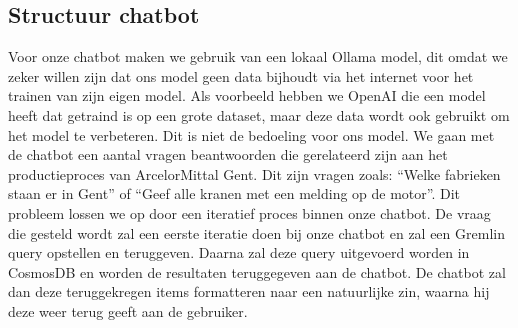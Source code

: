 \subsection{Structuur chatbot}
Voor onze chatbot maken we gebruik van een lokaal Ollama model, dit omdat we zeker willen zijn dat ons model geen data bijhoudt via het internet voor het trainen van zijn eigen model.
Als voorbeeld hebben we OpenAI die een model heeft dat getraind is op een grote dataset, maar deze data wordt ook gebruikt om het model te verbeteren. Dit is niet de bedoeling voor ons model.
We gaan met de chatbot een aantal vragen beantwoorden die gerelateerd zijn aan het productieproces van ArcelorMittal Gent. Dit zijn vragen zoals: ``Welke fabrieken staan er in Gent'' of ``Geef alle kranen met een melding op de motor''.
Dit probleem lossen we op door een iteratief proces binnen onze chatbot. De vraag die gesteld wordt zal een eerste iteratie doen bij onze chatbot en zal een Gremlin query opstellen en teruggeven. 
Daarna zal deze query uitgevoerd worden in CosmosDB en worden de resultaten teruggegeven aan de chatbot. De chatbot zal dan deze teruggekregen items formatteren naar een natuurlijke zin, waarna hij deze weer terug geeft aan de gebruiker.



